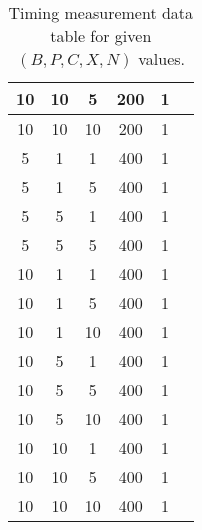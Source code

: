 \begin{enumerate}
\begin{table}[h]
\begin{center}
\begin{tabular}{|c|c|c|c|c|c|}
10   & 10   & 5   & 200   & 1   &   \\ \hline
10   & 10   & 10   & 200   & 1   &   \\ \hline
5   & 1   & 1   & 400   & 1   &   \\ \hline
5   & 1   & 5   & 400   & 1   &   \\ \hline
5   & 5   & 1   & 400   & 1   &   \\ \hline
5   & 5   & 5   & 400   & 1   &   \\ \hline
10   & 1   & 1   & 400   & 1   &   \\ \hline
10   & 1   & 5   & 400   & 1   &   \\ \hline
10   & 1   & 10   & 400   & 1   &   \\ \hline
10   & 5   & 1   & 400   & 1   &   \\ \hline
10   & 5   & 5   & 400   & 1   &   \\ \hline
10   & 5   & 10   & 400   & 1   &   \\ \hline
10   & 10   & 1   & 400   & 1   &   \\ \hline
10   & 10   & 5   & 400   & 1   &   \\ \hline
10   & 10   & 10   & 400   & 1   &   \\ \hline
          \end{tabular}
          \caption{Timing measurement data table for given $(B, P, C, X, N)$ values.}
          \label{tb_timing_lab3}
          \end{center}
          \end{table}


\end{enumerate}
